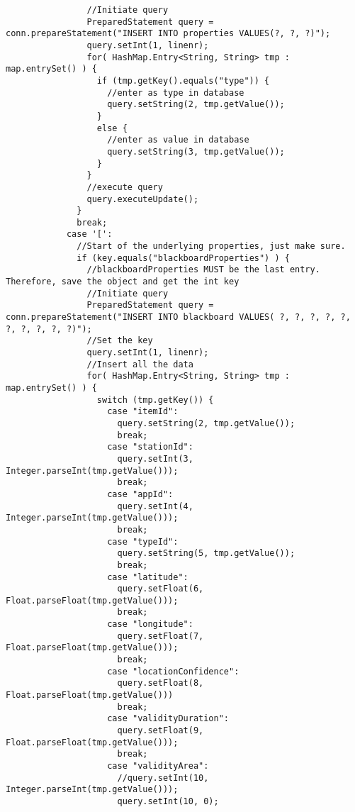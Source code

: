 \begin{lstlisting}
                //Initiate query
                PreparedStatement query = conn.prepareStatement("INSERT INTO properties VALUES(?, ?, ?)");
                query.setInt(1, linenr);
                for( HashMap.Entry<String, String> tmp : map.entrySet() ) {
                  if (tmp.getKey().equals("type")) {
                    //enter as type in database
                    query.setString(2, tmp.getValue());
                  }
                  else {
                    //enter as value in database
                    query.setString(3, tmp.getValue());
                  }
                }
                //execute query
                query.executeUpdate();
              }
              break;
            case '[':
              //Start of the underlying properties, just make sure.
              if (key.equals("blackboardProperties") ) {
                //blackboardProperties MUST be the last entry. Therefore, save the object and get the int key
                //Initiate query
                PreparedStatement query = conn.prepareStatement("INSERT INTO blackboard VALUES( ?, ?, ?, ?, ?, ?, ?, ?, ?, ?)");
                //Set the key
                query.setInt(1, linenr);
                //Insert all the data
                for( HashMap.Entry<String, String> tmp : map.entrySet() ) {
                  switch (tmp.getKey()) {
                    case "itemId":
                      query.setString(2, tmp.getValue());
                      break;
                    case "stationId":
                      query.setInt(3, Integer.parseInt(tmp.getValue()));
                      break;
                    case "appId":
                      query.setInt(4, Integer.parseInt(tmp.getValue()));
                      break;
                    case "typeId":
                      query.setString(5, tmp.getValue());
                      break;
                    case "latitude":
                      query.setFloat(6, Float.parseFloat(tmp.getValue()));
                      break;
                    case "longitude":
                      query.setFloat(7, Float.parseFloat(tmp.getValue()));
                      break;
                    case "locationConfidence":
                      query.setFloat(8, Float.parseFloat(tmp.getValue()))
                      break;
                    case "validityDuration":
                      query.setFloat(9, Float.parseFloat(tmp.getValue()));
                      break;
                    case "validityArea":
                      //query.setInt(10, Integer.parseInt(tmp.getValue()));
                      query.setInt(10, 0);

\end{lstlisting}
